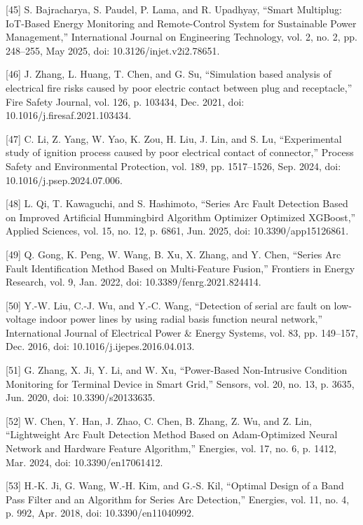 \begin{thesisreferences}
{[}45{]} S. Bajracharya, S. Paudel, P. Lama, and R. Upadhyay, ``Smart
Multiplug: IoT-Based Energy Monitoring and Remote-Control System for
Sustainable Power Management,'' International Journal on Engineering
Technology, vol. 2, no. 2, pp. 248--255, May 2025, doi:
10.3126/injet.v2i2.78651.

{[}46{]} J. Zhang, L. Huang, T. Chen, and G. Su, ``Simulation based
analysis of electrical fire risks caused by poor electric contact
between plug and receptacle,'' Fire Safety Journal, vol. 126, p. 103434,
Dec. 2021, doi: 10.1016/j.firesaf.2021.103434.

{[}47{]} C. Li, Z. Yang, W. Yao, K. Zou, H. Liu, J. Lin, and S. Lu,
``Experimental study of ignition process caused by poor electrical
contact of connector,'' Process Safety and Environmental Protection,
vol. 189, pp. 1517--1526, Sep. 2024, doi:
10.1016/j.psep.2024.07.006.

{[}48{]} L. Qi, T. Kawaguchi, and S. Hashimoto, ``Series Arc Fault
Detection Based on Improved Artificial Hummingbird Algorithm Optimizer
Optimized XGBoost,'' Applied Sciences, vol. 15, no. 12, p. 6861, Jun.
2025, doi: 10.3390/app15126861.

{[}49{]} Q. Gong, K. Peng, W. Wang, B. Xu, X. Zhang, and Y. Chen,
``Series Arc Fault Identification Method Based on Multi-Feature
Fusion,'' Frontiers in Energy Research, vol. 9, Jan. 2022, doi:
10.3389/fenrg.2021.824414.

{[}50{]} Y.-W. Liu, C.-J. Wu, and Y.-C. Wang, ``Detection of serial arc
fault on low-voltage indoor power lines by using radial basis function
neural network,'' International Journal of Electrical Power \& Energy
Systems, vol. 83, pp. 149--157, Dec. 2016, doi:
10.1016/j.ijepes.2016.04.013.

{[}51{]} G. Zhang, X. Ji, Y. Li, and W. Xu, ``Power-Based Non-Intrusive
Condition Monitoring for Terminal Device in Smart Grid,'' Sensors, vol.
20, no. 13, p. 3635, Jun. 2020, doi: 10.3390/s20133635.

{[}52{]} W. Chen, Y. Han, J. Zhao, C. Chen, B. Zhang, Z. Wu, and Z. Lin,
``Lightweight Arc Fault Detection Method Based on Adam-Optimized Neural
Network and Hardware Feature Algorithm,'' Energies, vol. 17, no. 6,
p. 1412, Mar. 2024, doi: 10.3390/en17061412.

{[}53{]} H.-K. Ji, G. Wang, W.-H. Kim, and G.-S. Kil, ``Optimal Design
of a Band Pass Filter and an Algorithm for Series Arc Detection,''
Energies, vol. 11, no. 4, p. 992, Apr. 2018, doi: 10.3390/en11040992.


\end{thesisreferences}
